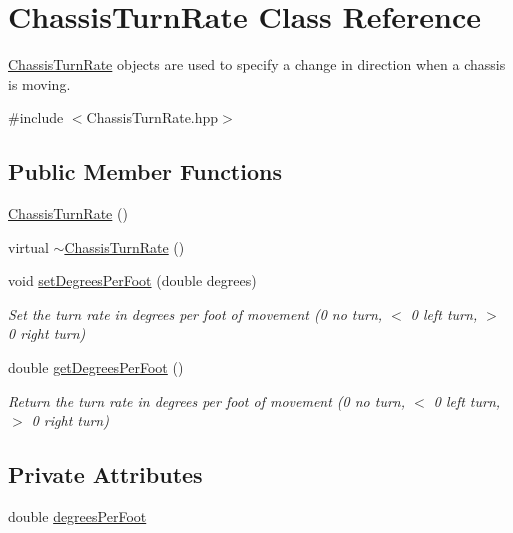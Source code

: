 \hypertarget{classChassisTurnRate}{\section{Chassis\-Turn\-Rate Class Reference}
\label{classChassisTurnRate}
}


\hyperlink{classChassisTurnRate}{Chassis\-Turn\-Rate} objects are used to specify a change in direction when a chassis is moving.  




{\ttfamily \#include $<$Chassis\-Turn\-Rate.\-hpp$>$}

\subsection*{Public Member Functions}
\begin{DoxyCompactItemize}
\item 
\hyperlink{classChassisTurnRate_a97fed34aa83daaa28c14df446e02032c}{Chassis\-Turn\-Rate} ()
\item 
virtual \hyperlink{classChassisTurnRate_a7e0856ef507c5bac1afb91ba5d333c10}{$\sim$\-Chassis\-Turn\-Rate} ()
\item 
void \hyperlink{classChassisTurnRate_a2872c6af13f72815afa146f1a232750a}{set\-Degrees\-Per\-Foot} (double degrees)
\begin{DoxyCompactList}\small\item\em Set the turn rate in degrees per foot of movement (0 no turn, $<$ 0 left turn, $>$ 0 right turn) \end{DoxyCompactList}\item 
double \hyperlink{classChassisTurnRate_aeca88ddb5526e23976725b869da67494}{get\-Degrees\-Per\-Foot} ()
\begin{DoxyCompactList}\small\item\em Return the turn rate in degrees per foot of movement (0 no turn, $<$ 0 left turn, $>$ 0 right turn) \end{DoxyCompactList}\end{DoxyCompactItemize}
\subsection*{Private Attributes}
\begin{DoxyCompactItemize}
\item 
double \hyperlink{classChassisTurnRate_aaf59ea5cc8374454397e0caec40a677f}{degrees\-Per\-Foot}
\end{DoxyCompactItemize}


